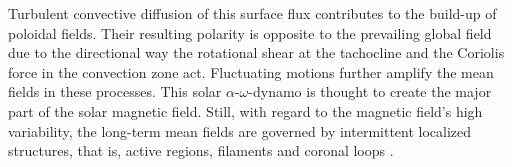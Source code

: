 Turbulent convective diffusion of this surface flux contributes to the build-up of poloidal fields. Their resulting polarity is opposite to the prevailing global field due to the directional way the rotational shear at the tachocline and the Coriolis force in the convection zone act. Fluctuating motions further amplify the mean fields in these processes. This solar $\alpha$-$\omega$-dynamo is thought to create the major part of the solar magnetic field. Still, with regard to the magnetic field's high variability, the long-term mean fields are governed by intermittent localized structures, that is, active regions, filaments and coronal loops \citep{Miesch2005}.	%




